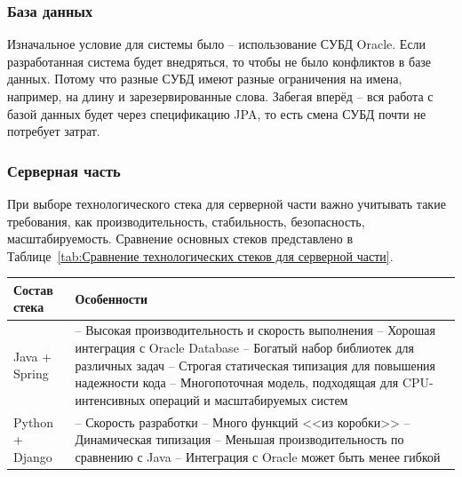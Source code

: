 \documentclass[a4paper,article]{article}
\begin{document}
\begin{sloppypar}
    \subsubsection{База данных}\label{Реализация. Выбор. База данных}

    Изначальное условие для системы было -- использование СУБД Oracle. Если разработанная система будет внедряться, то чтобы не было конфликтов в базе данных. Потому что разные СУБД имеют разные ограничения на имена, например, на длину и зарезервированные слова. Забегая вперёд -- вся работа с базой данных будет через спецификацию JPA, то есть смена СУБД почти не потребует затрат.

    \newpage

    \subsubsection{Серверная часть}\label{Реализация. Выбор. Серверная часть}

    При выборе технологического стека для серверной части важно учитывать такие требования, как производительность, стабильность, безопасность, масштабируемость. Сравнение основных стеков представлено в Таблице~\ref{tab:Сравнение технологических стеков для серверной части}.

    \begin{xltabular}{\textwidth} { |
        >{\hsize} X |
        >{\hsize} X | }

        \hline
        Состав стека
        & Особенности \\

        \hline
        Java + Spring
        & -- Высокая производительность и скорость выполнения \newline -- Хорошая интеграция с Oracle Database \newline -- Богатый набор библиотек для различных задач \newline -- Строгая статическая типизация для повышения надежности кода \newline -- Многопоточная модель, подходящая для CPU-интенсивных операций и масштабируемых систем \\

        \hline
        Python + Django
        & -- Скорость разработки \newline -- Много функций <<из коробки>> \newline -- Динамическая типизация \newline -- Меньшая производительность по сравнению с Java \newline -- Интеграция с Oracle может быть менее гибкой \\


\end{xltabular}
\end{sloppypar}
\end{document}
